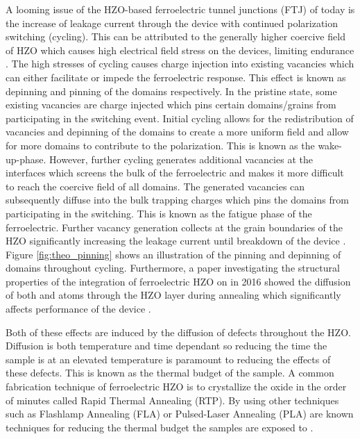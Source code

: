 \documentclass[11pt,twoside]{eitExjobb}
\begin{document}
A looming issue of the HZO-based ferroelectric tunnel junctions (FTJ) of today
is the increase of leakage current through the device with continued
polarization switching (cycling). This can be attributed to the generally
higher coercive field of HZO which causes high electrical field stress on the
devices, limiting endurance \cite{mikolajick2020past}. The high stresses of
cycling causes charge injection into existing vacancies which can either
facilitate or impede the ferroelectric response. This effect is known as
depinning and pinning of the domains respectively. In the pristine state,
some existing vacancies are charge injected which pins certain domains/grains
from participating in the switching event. Initial cycling allows for
the redistribution of vacancies and depinning of the domains to create a more
uniform field and allow for more domains to contribute to the polarization.
This is known as the wake-up-phase. However, further cycling generates
additional vacancies at the interfaces which screens the bulk of the
ferroelectric and makes it more difficult to reach the coercive field of all
domains. The generated vacancies can subsequently diffuse into the bulk
trapping charges which pins the domains from participating in the switching.
This is known as the fatigue phase of the ferroelectric. Further vacancy
generation collects at the grain boundaries of the HZO significantly increasing
the leakage current until breakdown of the device \cite{pesic2016physical}.
Figure \ref{fig:theo_pinning} shows an illustration of the pinning and
depinning of domains throughout cycling. Furthermore, a paper investigating the
structural properties of the integration of ferroelectric HZO on  in
2016 showed the diffusion of both  and  atoms through the HZO
layer during annealing which significantly affects performance of the device
\cite{kang2016structural}.

Both of these effects are induced by the diffusion of defects throughout the
HZO. Diffusion is both temperature and time dependant so reducing the time the
sample is at an elevated temperature is paramount to reducing the effects of
these defects. This is known as the thermal budget of the sample. A common
fabrication technique of ferroelectric HZO is to crystallize the oxide in the
order of minutes called Rapid Thermal Annealing (RTP). By using other
techniques such as Flashlamp Annealing (FLA) or Pulsed-Laser Annealing (PLA)
are known techniques for reducing the thermal budget the samples are exposed
to \cite{oconnor2018stabilization, grenouillet2020nanosecond, volodina2021ferroelectric}.
\end{document}
